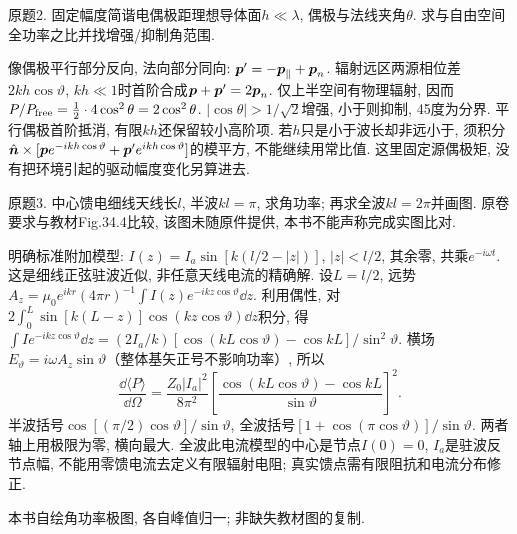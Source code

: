 \begin{exercise}
原题2. 固定幅度简谐电偶极距理想导体面$h\ll\lambda$, 偶极与法线夹角$\theta$. 求与自由空间全功率之比并找增强/抑制角范围.
\end{exercise}
\begin{solution}
像偶极平行部分反向, 法向部分同向: $\boldsymbol{p}'= -\boldsymbol{p}_\parallel+\boldsymbol{p}_n$. 辐射远区两源相位差$2kh\cos\vartheta$, $kh\ll1$时首阶合成$\boldsymbol{p}+\boldsymbol{p}'=2\boldsymbol{p}_n$. 仅上半空间有物理辐射, 因而$P/P_{\rm free}=\tfrac12\cdot4\cos^2\theta=2\cos^2\theta$. $|\cos\theta|>1/\sqrt2$增强, 小于则抑制, 45度为分界. 平行偶极首阶抵消, 有限$kh$还保留较小高阶项. 若$h$只是小于波长却非远小于, 须积分$\hat{\boldsymbol{n}}\times[\boldsymbol{p} e^{-ikh\cos\vartheta}+\boldsymbol{p}'e^{ikh\cos\vartheta}]$的模平方, 不能继续用常比值. 这里固定源偶极矩, 没有把环境引起的驱动幅度变化另算进去.
\end{solution}
\begin{exercise}
原题3. 中心馈电细线天线长$l$, 半波$kl=\pi$, 求角功率; 再求全波$kl=2\pi$并画图. 原卷要求与教材Fig.34.4比较, 该图未随原件提供, 本书不能声称完成实图比对.
\end{exercise}
\begin{solution}
明确标准附加模型: $I(z)=I_a\sin[k(l/2-|z|)]$, $|z|<l/2$, 其余零, 共乘$e^{-i\omega t}$. 这是细线正弦驻波近似, 非任意天线电流的精确解. 设$L=l/2$, 远势$A_z=\mu_0e^{ikr}(4\pi r)^{-1}\int I(z)e^{-ikz\cos\vartheta}\dd z$. 利用偶性, 对$2\int_0^L\sin[k(L-z)]\cos(kz\cos\vartheta)\dd z$积分, 得
$\int I e^{-ikz\cos\vartheta}\dd z=(2I_a/k)[\cos(kL\cos\vartheta)-\cos kL]/\sin^2\vartheta$.
横场$E_\vartheta=i\omega A_z\sin\vartheta$（整体基矢正号不影响功率）, 所以
\[
\frac{\dd\langle P\rangle}{\dd\Omega}=\frac{Z_0|I_a|^2}{8\pi^2}\left[\frac{\cos(kL\cos\vartheta)-\cos kL}{\sin\vartheta}\right]^2.
\]
半波括号$\cos[(\pi/2)\cos\vartheta]/\sin\vartheta$, 全波括号$[1+\cos(\pi\cos\vartheta)]/\sin\vartheta$. 两者轴上用极限为零, 横向最大. 全波此电流模型的中心是节点$I(0)=0$, $I_a$是驻波反节点幅, 不能用零馈电流去定义有限辐射电阻; 真实馈点需有限阻抗和电流分布修正.
\begin{center}\par
本书自绘角功率极图, 各自峰值归一; 非缺失教材图的复制.
\end{center}
\end{solution}
